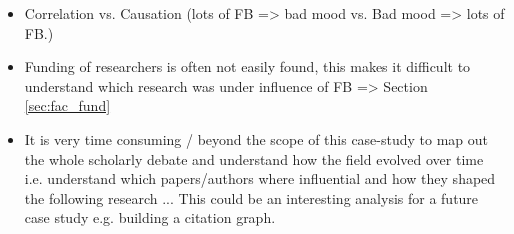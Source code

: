 \begin{enumerate}
\begin{itemize}
        \item Correlation vs. Causation (lots of FB => bad mood vs. Bad mood => lots of FB.)
        \item Funding of researchers is often not easily found, this makes it difficult to understand which research was under influence of FB => Section \ref{sec:fac_fund}
        \item It is very time consuming / beyond the scope of this case-study to map out the whole scholarly debate and understand how the field evolved over time i.e. understand which papers/authors where influential and how they shaped the following research ... This could be an interesting analysis for a future case study e.g. building a citation graph.
    \end{itemize} 
\end{enumerate}



